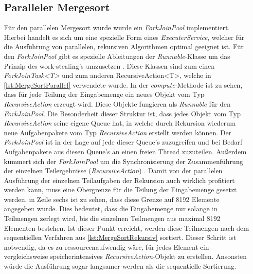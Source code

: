 \subsection{Paralleler Mergesort}

Für den parallelen Mergesort wurde wurde ein \emph{ForkJoinPool} implementiert. Hierbei handelt es sich um eine spezielle Form eines \emph{ExecuterService}, welcher für die Ausführung von parallelen, rekursiven Algorithmen optimal geeignet ist. Für den \emph{ForkJoinPool} gibt es spezielle Ableitungen der \emph{Runnable}-Klasse um das Prinzip des \glqq work-stealing's\grqq{} umzusetzen \cite{ForkJoinPoolOracle}. Diese Klassen sind zum einen \emph{ForkJoinTask<T>} und zum anderen RecursiveAction<T>, welche in \autoref{lst:MergeSortParallel} verwendete wurde. In der \emph{compute}-Methode ist zu sehen, dass für jede Teilung der Eingabemenge ein neues Objekt vom Typ \emph{RecursiveAction} erzeugt wird. Diese Objekte fungieren als \emph{Runnable} für den \emph{ForkJoinPool}. Die Besonderheit dieser Struktur ist, dass jedes Objekt vom Typ \emph{RecursiveAction} seine eigene Queue hat, in welche durch Rekursion wiederum neue Aufgabenpakete vom Typ \emph{RecursiveAction} erstellt werden können. Der \emph{ForkJoinPool} ist in der Lage auf jede dieser Queue's zuzugreifen und bei Bedarf Aufgabenpakete aus diesen Queue's an einen freien Thread zuzuteilen. Außerdem kümmert sich der \emph{ForkJoinPool} um die Synchronisierung der Zusammenführung der einzelnen Teilergebnisse (\emph{RecursiveAction}) \cite{ForkJoinPoolExplained}. Damit von der parallelen Ausführung der einzelnen Teilaufgaben der Rekursion auch wirklich profitiert werden kann, muss eine Obergrenze für die Teilung der Eingabemenge gesetzt werden. in Zeile sechs ist zu sehen, dass diese Grenze auf 8192 Elemente angegeben wurde. Dies bedeutet, dass die Eingabemenge nur solange in Teilmengen zerlegt wird, bis die einzelnen Teilmengen aus maximal 8192 Elementen bestehen. Ist dieser Punkt erreicht, werden diese Teilmengen nach dem sequentiellen Verfahren aus \autoref{lst:MergeSortRekursiv} sortiert. Dieser Schritt ist notwendig, da es zu ressourcenaufwendig wäre, für jedes Element ein vergleichsweise speicherintensives \emph{RecursiveAction}-Objekt zu erstellen. Ansonsten würde die Ausführung sogar langsamer werden als die sequentielle Sortierung.

